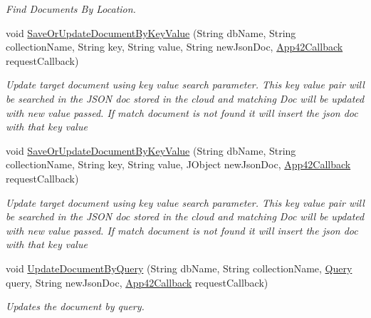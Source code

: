 \begin{DoxyCompactItemize}
\begin{DoxyCompactList}\small\item\em Find Documents By Location. \end{DoxyCompactList}\item 
void \hyperlink{classcom_1_1shephertz_1_1app42_1_1paas_1_1sdk_1_1windows_1_1storage_1_1_storage_service_a6273e59055fbb00592179417f85541d9}{Save\+Or\+Update\+Document\+By\+Key\+Value} (String db\+Name, String collection\+Name, String key, String value, String new\+Json\+Doc, \hyperlink{interfacecom_1_1shephertz_1_1app42_1_1paas_1_1sdk_1_1windows_1_1_app42_callback}{App42\+Callback} request\+Callback)
\begin{DoxyCompactList}\small\item\em Update target document using key value search parameter. This key value pair will be searched in the J\+S\+O\+N doc stored in the cloud and matching Doc will be updated with new value passed. If match document is not found it will insert the json doc with that key value \end{DoxyCompactList}\item 
void \hyperlink{classcom_1_1shephertz_1_1app42_1_1paas_1_1sdk_1_1windows_1_1storage_1_1_storage_service_adaf88867a9360827738048c6f901c3f8}{Save\+Or\+Update\+Document\+By\+Key\+Value} (String db\+Name, String collection\+Name, String key, String value, J\+Object new\+Json\+Doc, \hyperlink{interfacecom_1_1shephertz_1_1app42_1_1paas_1_1sdk_1_1windows_1_1_app42_callback}{App42\+Callback} request\+Callback)
\begin{DoxyCompactList}\small\item\em Update target document using key value search parameter. This key value pair will be searched in the J\+S\+O\+N doc stored in the cloud and matching Doc will be updated with new value passed. If match document is not found it will insert the json doc with that key value \end{DoxyCompactList}\item 
void \hyperlink{classcom_1_1shephertz_1_1app42_1_1paas_1_1sdk_1_1windows_1_1storage_1_1_storage_service_ac20f602edeb2933b6b24973b87502451}{Update\+Document\+By\+Query} (String db\+Name, String collection\+Name, \hyperlink{classcom_1_1shephertz_1_1app42_1_1paas_1_1sdk_1_1windows_1_1storage_1_1_query}{Query} query, String new\+Json\+Doc, \hyperlink{interfacecom_1_1shephertz_1_1app42_1_1paas_1_1sdk_1_1windows_1_1_app42_callback}{App42\+Callback} request\+Callback)
\begin{DoxyCompactList}\small\item\em Updates the document by query. \end{DoxyCompactList}\item 

\end{DoxyCompactItemize}
